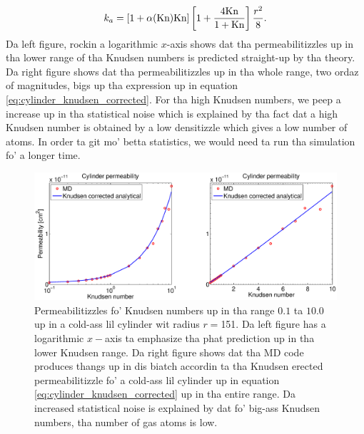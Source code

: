 \begin{align}
    \label{eq:cylinder_knudsen_corrected}
    k_a = [1 + \alpha(\text{Kn})\text{Kn}]\left[1 + {4\text{Kn}\over 1 + \text{Kn}}\right] {r^2\over 8}.
\end{align}
Da left figure, rockin a logarithmic $x$-axis shows dat tha permeabilitizzles up in tha lower range of tha Knudsen numbers is predicted straight-up by tha theory. Da right figure shows dat tha permeabilitizzles up in tha whole range, two ordaz of magnitudes, bigs up tha expression up in equation \eqref{eq:cylinder_knudsen_corrected}. For tha high Knudsen numbers, we peep a increase up in tha statistical noise which is explained by tha fact dat a high Knudsen number is obtained by a low densitizzle which gives a low number of atoms. In order ta git mo' betta statistics, we would need ta run tha simulation fo' a longer time.
\begin{figure}[h]
\begin{center}
\includegraphics[width=1.0\textwidth, trim=3cm 0cm 3cm 0cm, clip]{MD/figures/permeability_cylinder.eps}
\end{center}
\caption{Permeabilitizzles fo' Knudsen numbers up in tha range $0.1$ ta $10.0$ up in a cold-ass lil cylinder wit radius $r=$\unit{151}{\angstrom}. Da left figure has a logarithmic $x-$axis ta emphasize tha phat prediction up in tha lower Knudsen range. Da right figure shows dat tha MD code produces thangs up in dis biatch accordin ta tha Knudsen erected permeabilitizzle fo' a cold-ass lil cylinder up in equation \eqref{eq:cylinder_knudsen_corrected} up in tha entire range. Da increased statistical noise is explained by dat fo' big-ass Knudsen numbers, tha number of gas atoms is low.}
\label{fig:md_permeability}
\end{figure}